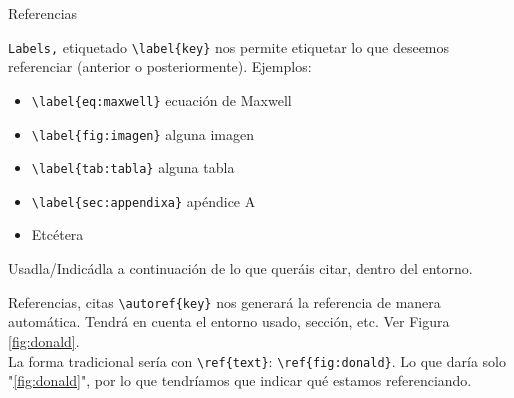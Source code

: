 \documentclass[12pt]{beamer}
\begin{document}
\begin{frame}{Referencias}
	\vspace*{-0.5em}
	\begin{block}{\texttt{Labels,} etiquetado}
		\verb|\label{key}| nos permite etiquetar lo que deseemos referenciar (anterior o posteriormente). Ejemplos:
		\begin{itemize} 
			\item \verb|\label{eq:maxwell}| ecuación de Maxwell
			\item \verb|\label{fig:imagen}| alguna imagen
			\item \verb|\label{tab:tabla}| alguna tabla
			\item \verb|\label{sec:appendixa}| apéndice A
			\item Etcétera
		\end{itemize}
		Usadla/Indicádla a continuación de lo que queráis citar, dentro del entorno.
	\end{block}

	\begin{block}{Referencias, citas}
		\verb|\autoref{key}| nos generará la referencia de manera automática. Tendrá en cuenta el entorno usado, sección, etc. Ver Figura \autoref{fig:donald}. \\
		\vspace{1em}
		La forma tradicional sería con \verb|\ref{text}|: \verb|\ref{fig:donald}|. Lo que daría solo "\ref{fig:donald}", por lo que tendríamos que indicar qué estamos referenciando.
	\end{block}
\end{frame}
\end{document}
